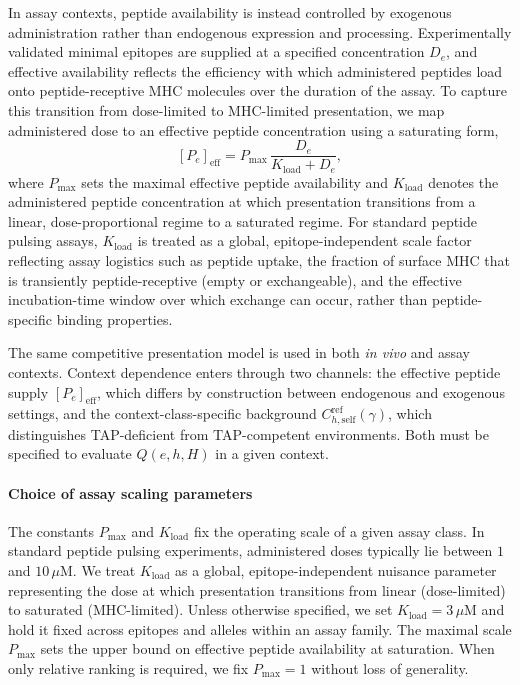 \documentclass[11pt]{article}
\begin{document}
In assay contexts, peptide availability is instead controlled by exogenous administration rather than endogenous expression and processing. Experimentally validated minimal epitopes are supplied at a specified concentration \(D_e\), and effective availability reflects the efficiency with which administered peptides load onto peptide-receptive MHC molecules over the duration of the assay. To capture this transition from dose-limited to MHC-limited presentation, we map administered dose to an effective peptide concentration using a saturating form,
\[
[P_e]_{\mathrm{eff}}
=
P_{\max}\,
\frac{D_e}{K_{\mathrm{load}} + D_e},
\]
where \(P_{\max}\) sets the maximal effective peptide availability and \(K_{\mathrm{load}}\) denotes the administered peptide concentration at which presentation transitions from a linear, dose-proportional regime to a saturated regime. For standard peptide pulsing assays, $K_{\mathrm{load}}$ is treated as a global, epitope-independent scale factor reflecting assay logistics such as peptide uptake, the fraction of surface MHC that is transiently peptide-receptive (empty or exchangeable), and the effective incubation-time window over which exchange can occur, rather than peptide-specific binding properties.


The same competitive presentation model is used in both \textit{in vivo} and assay contexts. Context dependence enters through two channels: the effective peptide supply \([P_e]_{\mathrm{eff}}\), which differs by construction between endogenous and exogenous settings, and the context-class-specific background \(C^{\mathrm{ref}}_{h,\mathrm{self}}(\gamma)\), which distinguishes TAP-deficient from TAP-competent environments. Both must be specified to evaluate \(Q(e,h,H)\) in a given context.

\paragraph{Choice of assay scaling parameters}
The constants \(P_{\max}\) and \(K_{\mathrm{load}}\) fix the operating scale of a given assay class. In standard peptide pulsing experiments, administered doses typically lie between \(1\) and \(10\,\mu\mathrm{M}\). We treat \(K_{\mathrm{load}}\) as a global, epitope-independent nuisance parameter representing the dose at which presentation transitions from linear (dose-limited) to saturated (MHC-limited). Unless otherwise specified, we set \(K_{\mathrm{load}} = 3\,\mu\mathrm{M}\) and hold it fixed across epitopes and alleles within an assay family. The maximal scale \(P_{\max}\) sets the upper bound on effective peptide availability at saturation. When only relative ranking is required, we fix \(P_{\max}=1\) without loss of generality.
\end{document}
